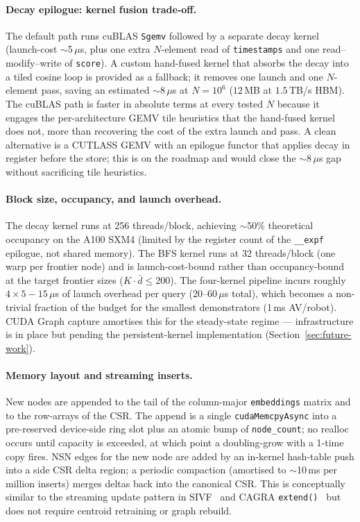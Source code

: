 \documentclass[11pt]{article}
\begin{document}
\paragraph{Decay epilogue: kernel fusion trade-off.} The default path
runs cuBLAS \texttt{Sgemv} followed by a separate decay kernel
(launch-cost $\sim$5\,$\mu$s, plus one extra $N$-element read of
\texttt{timestamps} and one read--modify--write of \texttt{score}).
A custom hand-fused kernel that absorbs the decay into a tiled cosine
loop is provided as a fallback; it removes one launch and one
$N$-element pass, saving an estimated $\sim$8\,$\mu$s at $N{=}10^6$
($12$\,MB at $1.5$\,TB/s HBM). The cuBLAS path is faster in absolute
terms at every tested $N$ because it engages the per-architecture
GEMV tile heuristics that the hand-fused kernel does not, more than
recovering the cost of the extra launch and pass. A clean alternative
is a CUTLASS GEMV with an epilogue functor that applies decay in
register before the store; this is on the roadmap and would close the
$\sim$8\,$\mu$s gap without sacrificing tile heuristics.

\paragraph{Block size, occupancy, and launch overhead.} The decay
kernel runs at 256 threads/block, achieving
$\sim$50\% theoretical occupancy on the A100 SXM4 (limited by the
register count of the \texttt{\_\_expf} epilogue, not shared memory).
The BFS kernel runs at 32 threads/block (one warp per frontier node)
and is launch-cost-bound rather than occupancy-bound at the target
frontier sizes ($K \cdot \bar{d} \le 200$). The four-kernel pipeline
incurs roughly $4 \times 5{-}15\,\mu$s of launch overhead per query
(20--60\,$\mu$s total), which becomes a non-trivial fraction of the
budget for the smallest demonstrators (1\,ms AV/robot). CUDA Graph
capture amortises this for the steady-state regime --- infrastructure
is in place but pending the persistent-kernel implementation
(Section~\ref{sec:future-work}).

\paragraph{Memory layout and streaming inserts.} New nodes are
appended to the tail of the column-major \texttt{embeddings} matrix and
to the row-arrays of the CSR. The append is a single
\texttt{cudaMemcpyAsync} into a pre-reserved device-side ring slot
plus an atomic bump of \texttt{node\_count}; no realloc occurs until
capacity is exceeded, at which point a doubling-grow with a 1-time
copy fires. NSN edges for the new node are added by an in-kernel
hash-table push into a side CSR delta region; a periodic compaction
(amortised to $\sim$10\,ms per million inserts) merges deltas back
into the canonical CSR. This is conceptually similar to the streaming
update pattern in SIVF~\cite{sivf} and CAGRA \texttt{extend()}~\cite{cagra_extend}
but does not require centroid retraining or graph rebuild.
\end{document}
